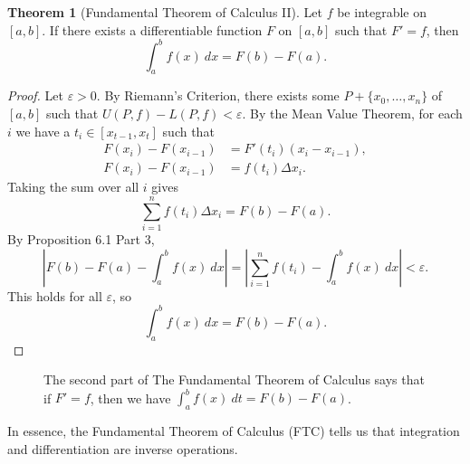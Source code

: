 \documentclass{article}
\newcommand{\R}{\mathbb{R}}
\theoremstyle{definition}
\newtheorem{theorem}{Theorem}[section]
\begin{document}
	\begin{theorem}[Fundamental Theorem of Calculus II]
		Let $ f $ be integrable on $ [a,b] $. If there exists a differentiable function $ F $ on $ [a,b] $ such that $ F'=f $, then $$ \int_{a}^{b}f(x)\ dx=F(b)-F(a).$$
	\end{theorem}
	\begin{proof}
		Let $ \varepsilon>0 $. By Riemann's Criterion, there exists some $ P+\{x_0,\ldots,x_n\} $ of $ [a,b] $ such that $ U(P,f)-L(P,f)<\varepsilon $. By the Mean Value Theorem, for each $ i $ we have a $ t_i\in[x_{t-1},x_t] $ such that \begin{align*}
			F(x_i)-F(x_{i-1})&=F'(t_i)(x_i-x_{i-1}),\\
			F(x_i)-F(x_{i-1})&=f(t_i)\Delta x_i.
		\end{align*}
		Taking the sum over all $ i $ gives $$\sum_{i=1}^{n}f(t_i)\Delta x_i=F(b)-F(a) .$$ By Proposition 6.1 Part 3, $$\left\lvert F(b)-F(a)-\int_{a}^{b}f(x)\ dx\right\rvert=\left\lvert\sum_{i=1}^{n}f(t_i)-\int_{a}^{b}f(x)\ dx\right\rvert<\varepsilon. $$ 
		This holds for all $ \varepsilon $, so $$\int_{a}^{b}f(x)\ dx=F(b)-F(a). $$
	\end{proof}
	\begin{figure}[h!]
		\centering
		\caption{The second part of The Fundamental Theorem of Calculus says that if $ F'=f $, then we have $ \int_{a}^{b}f(x)\ dt=F(b)-F(a) $.}
	\end{figure}
	In essence, the Fundamental Theorem of Calculus (FTC) tells us that integration and differentiation are inverse operations.
	
\end{document}
